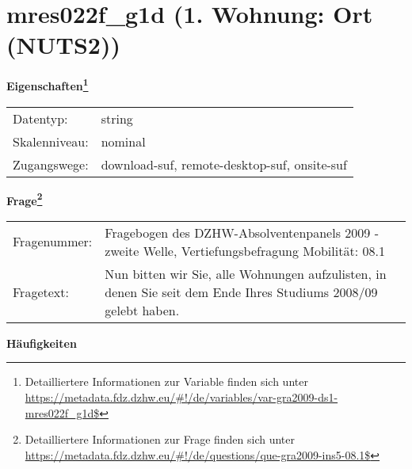 
    \setcounter{footnote}{0}

    \vspace*{-1.8cm}
	\section{mres022f\_g1d (1. Wohnung: Ort (NUTS2))}
	\label{section:mres022f_g1d}



    \vspace*{0.5cm}
    \noindent\textbf{Eigenschaften\footnote{Detailliertere Informationen zur Variable finden sich unter
		\url{https://metadata.fdz.dzhw.eu/\#!/de/variables/var-gra2009-ds1-mres022f_g1d$}}}\\
	\begin{tabularx}{\hsize}{@{}lX}
	Datentyp: & string \\
	Skalenniveau: & nominal \\
	Zugangswege: &
	  download-suf, 
	  remote-desktop-suf, 
	  onsite-suf
 \\
    \end{tabularx}



				\vspace*{0.5cm}
                \noindent\textbf{Frage\footnote{Detailliertere Informationen zur Frage finden sich unter
		              \url{https://metadata.fdz.dzhw.eu/\#!/de/questions/que-gra2009-ins5-08.1$}}}\\
				\begin{tabularx}{\hsize}{@{}lX}
					Fragenummer: &
					  Fragebogen des DZHW-Absolventenpanels 2009 - zweite Welle, Vertiefungsbefragung Mobilität:
					  08.1
 \\
					Fragetext: & Nun bitten wir Sie, alle Wohnungen aufzulisten, in denen Sie seit dem Ende Ihres Studiums 2008/09 gelebt haben. \\
				\end{tabularx}





        		\vspace*{0.5cm}
                \noindent\textbf{Häufigkeiten}

